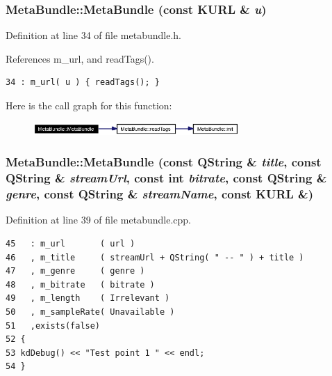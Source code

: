 \subsubsection{\setlength{\rightskip}{0pt plus 5cm}Meta\-Bundle::Meta\-Bundle (const KURL \& {\em u})\hspace{0.3cm}{\tt  [inline]}}\label{classMetaBundle_MetaBundlea1}




Definition at line 34 of file metabundle.h.

References m\_\-url, and read\-Tags().



\footnotesize\begin{verbatim}34 : m_url( u ) { readTags(); }
\end{verbatim}\normalsize 


Here is the call graph for this function:\begin{figure}[H]
\begin{center}
\leavevmode
\includegraphics[width=222pt]{classMetaBundle_MetaBundlea1_cgraph}
\end{center}
\end{figure}
\subsubsection{\setlength{\rightskip}{0pt plus 5cm}Meta\-Bundle::Meta\-Bundle (const QString \& {\em title}, const QString \& {\em stream\-Url}, const int {\em bitrate}, const QString \& {\em genre}, const QString \& {\em stream\-Name}, const KURL \&)}\label{classMetaBundle_MetaBundlea2}




Definition at line 39 of file metabundle.cpp.



\footnotesize\begin{verbatim}45   : m_url       ( url )
46   , m_title     ( streamUrl + QString( " -- " ) + title )
47   , m_genre     ( genre )
48   , m_bitrate   ( bitrate )
49   , m_length    ( Irrelevant )
50   , m_sampleRate( Unavailable )
51   ,exists(false)
52 {
53 kdDebug() << "Test point 1 " << endl;
54 }
\end{verbatim}\normalsize 
{}
